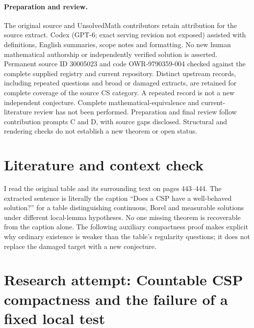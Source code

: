 \documentclass[11pt]{article}
\begin{document}
\paragraph{Preparation and review.}
The original source and UnsolvedMath contributors retain attribution for the source extract. Codex (GPT-6; exact serving revision not exposed) assisted with definitions, English summaries, scope notes and formatting. No new human mathematical authorship or independently verified solution is asserted. Permanent source ID 30005023 and code OWR-9790359-004 checked against the complete supplied registry and current repository. Distinct upstream records, including repeated questions and broad or damaged extracts, are retained for complete coverage of the source CS category. A repeated record is not a new independent conjecture. Complete mathematical-equivalence and current-literature review has not been performed. Preparation and final review follow contribution prompts C and D, with source gaps disclosed. Structural and rendering checks do not establish a new theorem or open status.
\label{end:30005023}

\section{Literature and context check}

I read the original table and its surrounding text on pages 443--444. The
extracted sentence is literally the caption ``Does a CSP have a well-behaved
solution?'' for a table distinguishing continuous, Borel and measurable
solutions under different local-lemma hypotheses. No one missing theorem is
recoverable from the caption alone. The following auxiliary compactness proof
makes explicit why ordinary existence is weaker than the table's regularity
questions; it does not replace the damaged target with a new conjecture.

\section{Research attempt: Countable CSP compactness and the failure of a fixed local test}
\end{document}
